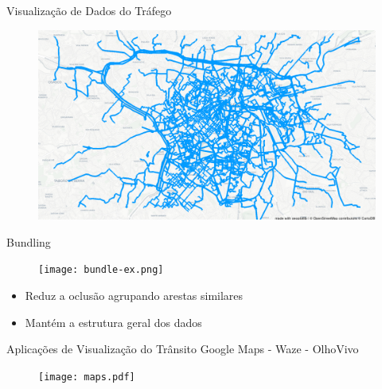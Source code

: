 \begin{frame}{Visualização de Dados do Tráfego}
  \begin{figure}[!htb]
    \centering
    \includegraphics[width=\textwidth]{../figuras/trafego-ocluso.png}
  \end{figure}
\end{frame}




{
\begin{frame}{Bundling}
  \begin{figure}[!htb]
    \centering
    \texttt{[image: bundle-ex.png]}
  \end{figure}

  \pause
  \begin{itemize}
    \item Reduz a oclusão agrupando arestas similares
    \item Mantém a estrutura geral dos dados
  \end{itemize}
\end{frame}
}

\begin{frame}{Aplicações de Visualização do Trânsito}
  \centering
  Google Maps - Waze - OlhoVivo
  \begin{figure}[!htb]
    \centering
    \texttt{[image: maps.pdf]}
  \end{figure}
 \end{frame}

